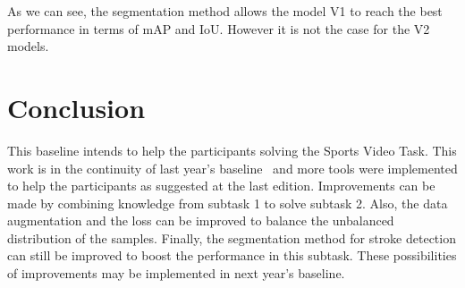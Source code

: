 \documentclass[
]{ceurart}
\begin{document}
As we can see, the segmentation method allows the model V1 to reach the best performance in terms of mAP and IoU. However it is not the case for the V2 models. 

\section{Conclusion}
\label{sec:discussion}

This baseline intends to help the participants solving the Sports Video Task. This work is in the continuity of last year's baseline~\cite{mediaeval/Martin21/baseline} and more tools were implemented to help the participants as suggested at the last edition. Improvements can be made by combining knowledge from subtask 1 to solve subtask 2. Also, the data augmentation and the loss can be improved to balance the unbalanced distribution of the samples. Finally, the segmentation method for stroke detection can still be improved to boost the performance in this subtask. These possibilities of improvements may be implemented in next year's baseline.


\def\bibfont{\footnotesize}  
\end{document}
